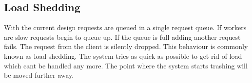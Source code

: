 \documentclass[milestone1.tex]{subfiles}
\begin{document}
\subsection{Load Shedding}
With the current design requests are queued in a single request queue. If workers are slow requests begin to queue up. If the queue is full adding another request fails. The request from the client is silently dropped. This behaviour is commonly known as load shedding. The system tries as quick as possible to get rid of load which cant be handled any more. The point where the system starts trashing will be moved further away.
\end{document}
